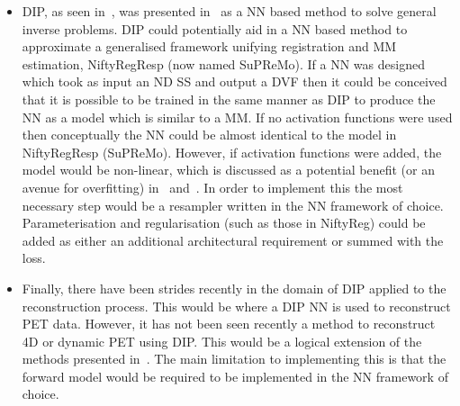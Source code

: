 \begin{itemize}
            \item \gls{DIP}, as seen in~, was presented in~\parencite{Ulyanov2020DeepPrior} as a \gls{NN} based method to solve general inverse problems. \gls{DIP} could potentially aid in a \gls{NN} based method to approximate a generalised framework unifying registration and \gls{MM} estimation, NiftyRegResp (now named \gls{SuPReMo}). If a \gls{NN} was designed which took as input an \gls{ND} \gls{SS} and output a \gls{DVF} then it could be conceived that it is possible to be trained in the same manner as \gls{DIP} to produce the \gls{NN} as a model which is similar to a \gls{MM}. If no activation functions were used then conceptually the \gls{NN} could be almost identical to the model in NiftyRegResp (\gls{SuPReMo}). However, if activation functions were added, the model would be non-linear, which is discussed as a potential benefit (or an avenue for overfitting) in~ and~. In order to implement this the most necessary step would be a resampler written in the \gls{NN} framework of choice. Parameterisation and regularisation (such as those in NiftyReg) could be added as either an additional architectural requirement or summed with the loss.

            \item Finally, there have been strides recently in the domain of \gls{DIP} applied to the reconstruction process. This would be where a \gls{DIP} \gls{NN} is used to reconstruct \gls{PET} data. However, it has not been seen recently a method to reconstruct \gls{4D} or dynamic \gls{PET} using \gls{DIP}. This would be a logical extension of the methods presented in~. The main limitation to implementing this is that the forward model would be required to be implemented in the \gls{NN} framework of choice.
        \end{itemize}
